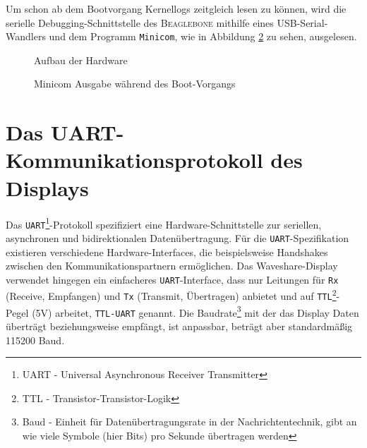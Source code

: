 Um schon ab dem Bootvorgang Kernellogs zeitgleich lesen zu können, wird die serielle Debugging-Schnittstelle des \textsc{Beaglebone} mithilfe eines USB-Serial-Wandlers und dem Programm \texttt{Minicom}, wie in Abbildung \ref{pic:minicom} zu sehen, ausgelesen. 

\begin{figure}[H]
  \centering
  \caption{Aufbau der Hardware}
  \label{pic:hw_aufbau}
\end{figure}

\begin{figure}[H]
  \centering
  \caption{Minicom Ausgabe während des Boot-Vorgangs}
  \label{pic:minicom}
\end{figure}

\section{Das UART-Kommunikationsprotokoll des Displays}
Das \texttt{UART}\footnote{UART - Universal Asynchronous Receiver Transmitter}-Protokoll spezifiziert eine Hardware-Schnittstelle zur seriellen, asynchronen und bidirektionalen Datenübertragung. Für die \texttt{UART}-Spezifikation existieren verschiedene Hardware-Interfaces, die beispielsweise Handshakes zwischen den Kommunikationspartnern ermöglichen. Das Waveshare-Display verwendet hingegen ein einfacheres \texttt{UART}-Interface, dass nur Leitungen für \texttt{Rx} (Receive, Empfangen) und \texttt{Tx} (Transmit, Übertragen) anbietet und auf \texttt{TTL}\footnote{TTL - Transistor-Transistor-Logik}-Pegel (5V) arbeitet, \texttt{TTL-UART} genannt. Die Baudrate\footnote{Baud - Einheit für Datenübertragungsrate in der Nachrichtentechnik, gibt an wie viele Symbole (hier Bits) pro Sekunde übertragen werden} mit der das Display Daten überträgt beziehungsweise empfängt, ist anpassbar, beträgt aber standardmäßig 115200 Baud. 
\newline


